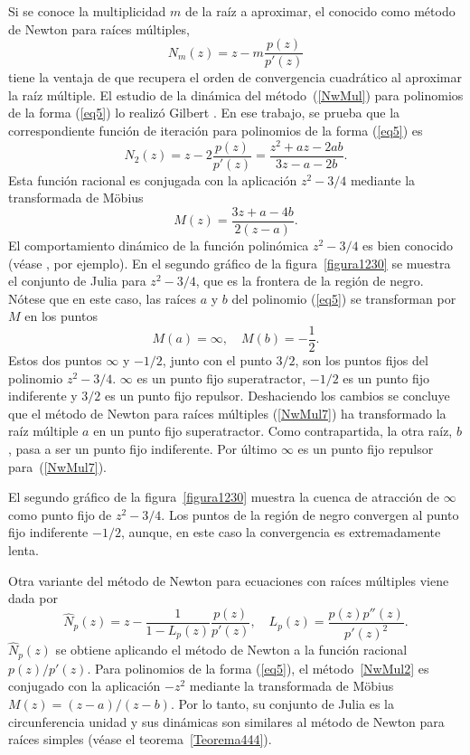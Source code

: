 Si se conoce la multiplicidad $m$ de la raíz a aproximar,  el conocido como método de Newton para raíces múltiples,
\begin{equation}\label{NwMul}
N_m(z)=z-m\frac{p(z)}{p'(z)}
\end{equation}
tiene la ventaja de que recupera el orden de convergencia cuadrático al aproximar la raíz múltiple. El estudio de la dinámica del método~(\ref{NwMul})
para  polinomios de la forma (\ref{eq5}) lo realizó Gilbert \cite{Gilbert}. En ese trabajo, se prueba que la correspondiente función de iteración para polinomios de la forma (\ref{eq5}) es
\begin{equation}\label{NwMul7}
N_2(z)=z-2\frac{p(z)}{p'(z)}=\frac{z^2+az-2ab}{3z-a-2b}.
\end{equation}
Esta función racional  es conjugada con la aplicación $z^2-3/4$ mediante la transformada de M\"obius 
$$
M(z)=\frac{3z+a-4b}{2(z-a)}.
$$ 
El comportamiento dinámico de la función polinómica $z^2-3/4$ es bien conocido (véase \cite{Beardon}, por ejemplo). En el segundo gráfico de la figura~\ref{figura1230} se muestra el conjunto de Julia  para $z^2-3/4$, que es la frontera de la región de negro. Nótese que en este caso, las raíces $a$ y $b$ del polinomio (\ref{eq5}) se transforman por $M$ en los puntos
$$
M(a)=\infty, \quad M(b)=-\frac{1}{2}.
$$
Estos dos puntos $\infty$ y $-1/2$, junto con el punto $3/2$, son los puntos fijos del polinomio $z^2-3/4$. $\infty$ es un punto fijo superatractor, $-1/2$ es un punto fijo indiferente y $3/2$ es un punto fijo repulsor. Deshaciendo los cambios se concluye que el método de Newton para raíces múltiples (\ref{NwMul7}) ha transformado la raíz múltiple $a$ en un punto fijo superatractor. Como contrapartida, la otra raíz, $b$, pasa a ser un punto fijo indiferente. Por último $\infty$ es un punto fijo repulsor para~(\ref{NwMul7}).

El segundo gráfico de la figura~\ref{figura1230}  muestra la cuenca de atracción de $\infty$ como punto fijo de $z^2-3/4$. Los puntos de la región de negro convergen al punto fijo indiferente $-1/2$, aunque, en este caso la convergencia es extremadamente lenta.

Otra variante del método de Newton para ecuaciones con raíces múltiples viene dada por
\begin{equation}\label{NwMul2}
\hat{N}_p(z)=z-\frac{1}{1-L_p(z)}\frac{p(z)}{p'(z)}, \quad L_p(z)=\frac{p(z)p''(z)}{p'(z)^2}.
\end{equation}
$\hat{N}_p(z)$ se obtiene aplicando el método de Newton a la función racional $p(z)/p'(z)$. Para polinomios de la forma (\ref{eq5}), el método~\ref{NwMul2}
 es conjugado con la aplicación $-z^2$ mediante la transformada de Möbius $M(z)=(z-a)/(z-b)$. Por lo tanto, su conjunto de Julia  es la circunferencia unidad y sus dinámicas son similares al método de Newton para raíces simples (véase el teorema~\ref{Teorema444}).



